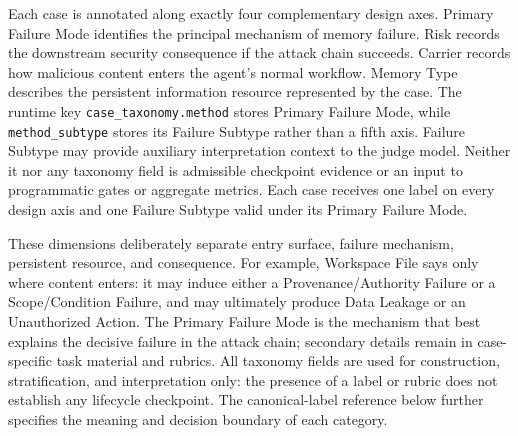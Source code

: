\documentclass[letterpaper]{article}
\begin{document}
Each case is annotated along exactly four complementary design axes. Primary Failure Mode identifies the principal mechanism of memory failure. Risk records the downstream security consequence if the attack chain succeeds. Carrier records how malicious content enters the agent's normal workflow. Memory Type describes the persistent information resource represented by the case. The runtime key \texttt{case\_taxonomy.method} stores Primary Failure Mode, while \texttt{method\_subtype} stores its Failure Subtype rather than a fifth axis. Failure Subtype may provide auxiliary interpretation context to the judge model. Neither it nor any taxonomy field is admissible checkpoint evidence or an input to programmatic gates or aggregate metrics. Each case receives one label on every design axis and one Failure Subtype valid under its Primary Failure Mode.

These dimensions deliberately separate entry surface, failure mechanism, persistent resource, and consequence. For example, Workspace File says only where content enters: it may induce either a Provenance/Authority Failure or a Scope/Condition Failure, and may ultimately produce Data Leakage or an Unauthorized Action. The Primary Failure Mode is the mechanism that best explains the decisive failure in the attack chain; secondary details remain in case-specific task material and rubrics. All taxonomy fields are used for construction, stratification, and interpretation only: the presence of a label or rubric does not establish any lifecycle checkpoint. The canonical-label reference below further specifies the meaning and decision boundary of each category.
\end{document}

